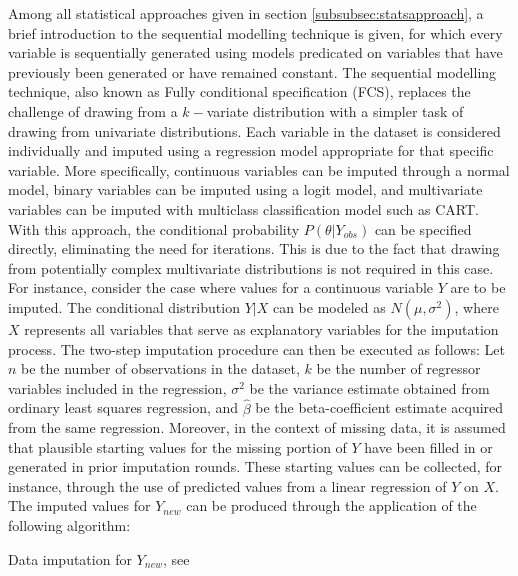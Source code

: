 Among all statistical approaches given in section \ref{subsubsec:statsapproach}, a brief introduction to the sequential modelling technique is given, for which every variable is sequentially generated using models predicated on variables that have previously been generated or have remained constant. The sequential modelling technique, also known as Fully conditional specification (FCS), replaces the challenge of drawing from a $k-$variate distribution with a simpler task of drawing from univariate distributions. Each variable in the dataset is considered individually and imputed using a regression model appropriate for that specific variable. More specifically, continuous variables can be imputed through a normal model, binary variables can be imputed using a logit model, and multivariate variables can be imputed with multiclass classification model such as CART. With this approach, the conditional probability $P(\theta|Y_{obs})$ can be specified directly, eliminating the need for iterations. This is due to the fact that drawing from potentially complex multivariate distributions is not required in this case. For instance, consider the case where values for a continuous variable $Y$ are to be imputed. The conditional distribution $Y|X$ can be modeled as $N(\mu ,\sigma^2)$, where $X$ represents all variables that serve as explanatory variables for the imputation process. The two-step imputation procedure can then be executed as follows: Let $n$ be the number of observations in the dataset, $k$ be the number of regressor variables included in the regression, $\sigma^2$ be the variance estimate obtained from ordinary least squares regression, and $\hat{\beta}$ be the beta-coefficient estimate acquired from the same regression. Moreover, in the context of missing data, it is assumed that plausible starting values for the missing portion of $Y$ have been filled in or generated in prior imputation rounds. These starting values can be collected, for instance, through the use of predicted values from a linear regression of $Y$ on $X$. The imputed values for $Y_{new}$ can be produced through the application of the following algorithm:
\begin{algorithm}[H]
    \caption{Data imputation for $Y_{new}$, see \cite{drechsler2011synthetic}}
\end{algorithm}


